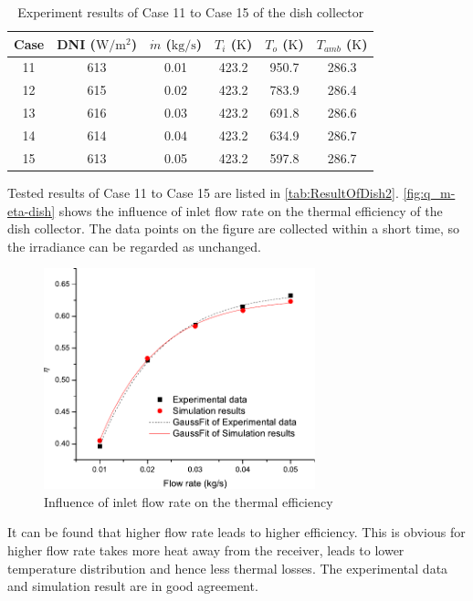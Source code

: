 \begin{table}[htbp]\footnotesize
	\caption{Experiment results of Case 11 to Case 15 of the dish collector}
	\centering
	\begin{tabular}{cccccc}
		\toprule
		Case	& DNI ($\mathrm{W/m^2}$)	&	$\dot{m}$ ($\mathrm{kg/s}$)			&	$T_i$ ($\mathrm{K}$)	&	$T_o$ ($\mathrm{K}$)		&	$T_{amb}$ ($\mathrm{K}$)\\
		\midrule
		11	&	613	&	0.01	&	423.2	&	950.7	&	286.3\\
		12	&	615	&	0.02	&	423.2	&	783.9	&	286.4\\
		13	&	616	&	0.03	&	423.2	&	691.8	&	286.6	\\
		14	&	614	&	0.04	&	423.2	&	634.9	&	286.7\\
		15	&	613	&	0.05	&	423.2	&	597.8	&	286.7\\
		\bottomrule
	\end{tabular}
	
	\label{tab:ResultOfDish2}
\end{table}
Tested results of Case 11 to Case 15 are listed in \autoref{tab:ResultOfDish2}.
\autoref{fig:q_m-eta-dish} shows the influence of inlet flow rate on the thermal efficiency of the dish collector. The data points on the figure are collected within a short time, so the irradiance can be regarded as unchanged.
\begin{figure}[!ht]
\centering
\includegraphics[width=0.7\textwidth]{fig/q_m-eta-dish}
\caption{Influence of inlet flow rate on the thermal efficiency}
\label{fig:q_m-eta-dish}
\end{figure}

It can be found that higher flow rate leads to higher efficiency. This is obvious for higher flow rate takes more heat away from the receiver, leads to lower temperature distribution and hence less thermal losses. The experimental data and simulation result are in good agreement.

